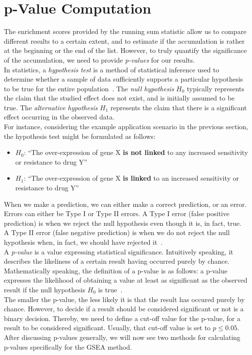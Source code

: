 \section{p-Value Computation}\label{sec:p-value}

The enrichment scores provided by the running sum statistic allow us to compare different results to a certain extent, and to estimate if the accumulation is rather at the beginning or the end of the list. However, to truly quantify the significance of the accumulation, we need to provide \emph{p-values} for our results.\\
In statistics, a \emph{hypothesis test} is a method of statistical inference used to determine whether a sample of data sufficiently supports a particular hypothesis to be true for the entire population~\cite{statistics_moore}. The \emph{null hypothesis} $H_0$ typically represents the claim that the studied effect does not exist, and is initially assumed to be true. The \emph{alternative hypothesis} $H_1$ represents the claim that there is a significant effect occurring in the observed data.\\
For instance, considering the example application scenario in the previous section, the hypothesis test might be formulated as follows:
\begin{itemize}
	\item $H_0$: ``The over-expression of gene X \textbf{is not linked} to any increased sensitivity or resistance to drug Y''
	\item $H_1$: ``The over-expression of gene X \textbf{is linked} to an increased sensitivity or resistance to drug Y''
\end{itemize}
When we make a prediction, we can either make a correct prediction, or an error. Errors can either be Type I or Type II errors. A Type I error (false positive prediction) is when we reject the null hypothesis even though it is, in fact, true. A Type II error (false negative prediction) is when we do not reject the null hypothesis when, in fact, we should have rejected it~\cite{type1type2error}.\\
A \emph{p-value} is a value expressing statistical significance. Intuitively speaking, it describes the likeliness of a certain result having occurred purely by chance.
Mathematically speaking, the definition of a p-value is as follows: a p-value expresses the likelihood of obtaining a value at least as significant as the observed result if the null hypothesis $H_{0}$ is true~\cite{p-value_def}.\\
The smaller the p-value, the less likely it is that the result has occured purely by chance. However, to decide if a result should be considered significant or not is a binary decision. Thereby, we need to define a cut-off value for the p-value, for a result to be considered significant. Usually, that cut-off value is set to $p \leq 0.05$.\\
After discussing p-values generally, we will now see two methods for calculating p-values specifically for the GSEA method.

